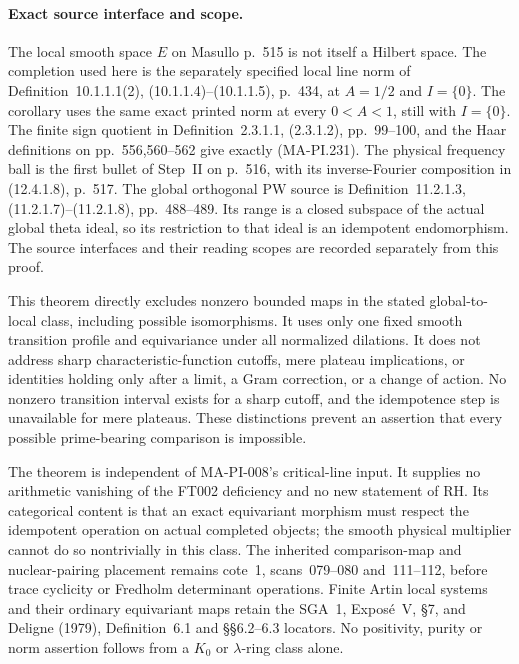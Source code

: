 \paragraph{Exact source interface and scope.}
The local smooth space $E$ on Masullo p.~515 is not itself
a Hilbert space. The completion used here is the separately
specified local line norm of Definition~10.1.1.1(2),
(10.1.1.4)--(10.1.1.5), p.~434, at $A=1/2$ and $I=\{0\}$.
The corollary uses the same exact printed norm at every
$0<A<1$, still with $I=\{0\}$.
The finite sign quotient in Definition~2.3.1.1,
(2.3.1.2), pp.~99--100, and the Haar definitions on
pp.~556,560--562 give exactly (MA-PI.231).
The physical frequency ball is the first bullet of
Step~II on p.~516, with its inverse-Fourier composition
in (12.4.1.8), p.~517. The global orthogonal PW source
is Definition~11.2.1.3, (11.2.1.7)--(11.2.1.8),
pp.~488--489. Its range is a closed subspace of the actual
global theta ideal, so its restriction to that ideal
is an idempotent endomorphism. The source interfaces and
their reading scopes are recorded separately from this proof.

This theorem directly excludes nonzero bounded maps in
the stated global-to-local class, including possible
isomorphisms. It uses only one fixed smooth transition
profile and equivariance under all normalized dilations.
It does not address sharp characteristic-function cutoffs,
mere plateau implications, or identities holding only
after a limit, a Gram correction, or a change of action.
No nonzero transition interval exists for a sharp cutoff,
and the idempotence step is unavailable for mere plateaus.
These distinctions prevent an assertion that every possible
prime-bearing comparison is impossible.

The theorem is independent of MA-PI-008's critical-line
input. It supplies no arithmetic vanishing of the FT002
deficiency and no new statement of RH. Its categorical
content is that an exact equivariant morphism must respect
the idempotent operation on actual completed objects;
the smooth physical multiplier cannot do so nontrivially
in this class. The inherited comparison-map and nuclear-pairing
placement remains cote~1, scans~079--080 and~111--112,
before trace cyclicity or Fredholm determinant operations.
Finite Artin local systems and their ordinary equivariant
maps retain the SGA~1, Expos\'e~V, \S7, and Deligne (1979),
Definition~6.1 and \S\S6.2--6.3 locators. No positivity,
purity or norm assertion follows from a $K_0$ or
$\lambda$-ring class alone.
